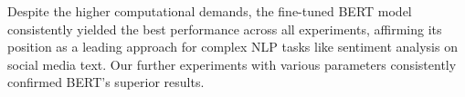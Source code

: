 Despite the higher computational demands, the fine-tuned BERT model consistently yielded the best performance across all experiments, affirming its position as a leading approach for complex NLP tasks like sentiment analysis on social media text. Our further experiments with various parameters consistently confirmed BERT's superior results.








